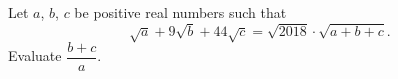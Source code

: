 Let $a$, $b$, $c$ be positive real numbers such that
\[
\sqrt a+9\sqrt b+44\sqrt c=\sqrt{2018}\cdot\sqrt{a+b+c}.
\]
Evaluate $\dfrac{b+c}{a}$.
